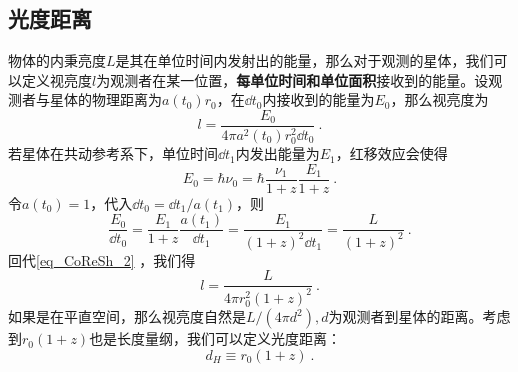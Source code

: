 \subsection{光度距离}
物体的内秉亮度$L$是其在单位时间内发射出的能量，那么对于观测的星体，我们可以定义视亮度$l$为观测者在某一位置，\textbf{每单位时间和单位面积}接收到的能量。设观测者与星体的物理距离为$a(t_0)r_0$，在$\dd t_0$内接收到的能量为$E_0$，那么视亮度为
\begin{equation}\label{eq_CoReSh_2}
l=\frac{E_0}{4\pi a^2(t_0)r_0^2\dd t_0}~.
\end{equation}
若星体在共动参考系下，单位时间$\dd t_1$内发出能量为$E_1$，红移效应会使得
\begin{equation}
E_0=\hbar\nu_0=\hbar \frac{\nu_1}{1+z}\frac{E_1}{1+z}~.
\end{equation}
令$a(t_0)=1$，代入$\dd t_0=\dd t_1/a(t_1)$，则
\begin{equation}
\frac{E_0}{\dd t_0}=\frac{E_1}{1+z}\frac{a(t_1)}{\dd t_1}=\frac{E_1}{(1+z)^2\dd t_1}=\frac{L}{(1+z)^2}~.
\end{equation}
回代\autoref{eq_CoReSh_2} ，我们得
\begin{equation}
l=\frac{L}{4\pi r_0^2(1+z)^2}~.
\end{equation}
如果是在平直空间，那么视亮度自然是$L/(4\pi d^2),d$为观测者到星体的距离。考虑到$r_0(1+z)$也是长度量纲，我们可以定义光度距离：
\begin{equation}
d_H\equiv r_0(1+z)~.
\end{equation}